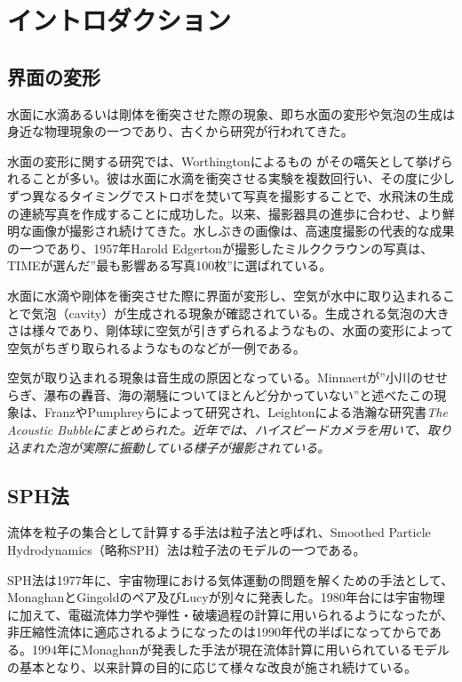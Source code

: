 \documentclass[]{jsarticle}
\begin{document}
\section{イントロダクション}
\subsection{界面の変形}
水面に水滴あるいは剛体を衝突させた際の現象、即ち水面の変形や気泡の生成は身近な物理現象の一つであり、古くから研究が行われてきた。

水面の変形に関する研究では、Worthingtonによるもの \cite{Worthington1908}がその嚆矢として挙げられることが多い。彼は水面に水滴を衝突させる実験を複数回行い、その度に少しずつ異なるタイミングでストロボを焚いて写真を撮影することで、水飛沫の生成の連続写真を作成することに成功した。以来、撮影器具の進歩に合わせ、より鮮明な画像が撮影され続けてきた。水しぶきの画像は、高速度撮影の代表的な成果の一つであり、1957年Harold Edgertonが撮影したミルククラウンの写真は、TIMEが選んだ”最も影響ある写真100枚”に選ばれている。

水面に水滴や剛体を衝突させた際に界面が変形し、空気が水中に取り込まれることで気泡（cavity）が生成される現象が確認されている。生成される気泡の大きさは様々であり、剛体球に空気が引きずられるようなもの\cite{Worthington1908}\cite{Mallock1918}、水面の変形によって空気がちぎり取られるようなもの\cite{Oguz1990}などが一例である。

空気が取り込まれる現象は音生成の原因となっている。Minnaert\cite{minnaert1933xvi}が”小川のせせらぎ、瀑布の轟音、海の潮騒についてほとんど分かっていない”と述べたこの現象は、Franz\cite{Franz1959}やPumphrey\cite{Pumphrey1990}らによって研究され、Leightonによる浩瀚な研究書\it{The Acoustic Bubble}\cite{leightonacoustic}にまとめられた。近年では、ハイスピードカメラを用いて、取り込まれた泡が実際に振動している様子が撮影されている\cite{Phillips2018}。

\subsection{SPH法}
流体を粒子の集合として計算する手法は粒子法と呼ばれ、\rm{Smoothed Particle Hydrodynamics}（略称SPH）法は粒子法のモデルの一つである。

SPH法は1977年に、宇宙物理における気体運動の問題を解くための手法として、MonaghanとGingold\cite{Gingold1977}のペア及びLucy\cite{Lucy1977}が別々に発表した。1980年台には宇宙物理に加えて、電磁流体力学や弾性・破壊過程の計算に用いられるようになったが、非圧縮性流体に適応されるようになったのは1990年代の半ばになってからである。1994年にMonaghan\cite{Monaghan1994}が発表した手法が現在流体計算に用いられているモデルの基本となり、以来計算の目的に応じて様々な改良が施され続けている。
\end{document}
